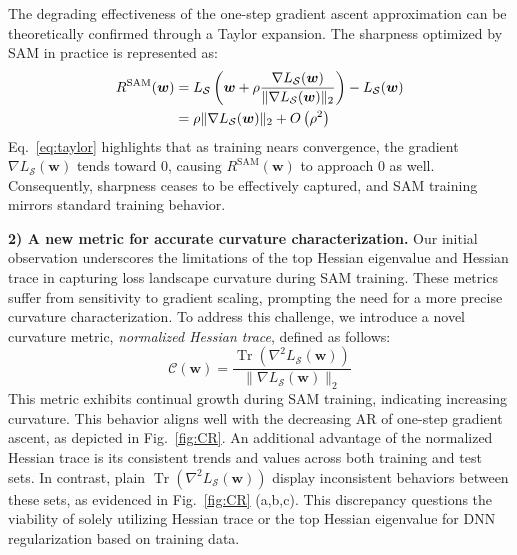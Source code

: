 \documentclass[letterpaper]{article} %
\theoremstyle{plain}
\theoremstyle{definition}
\newcommand{\fref}[1]{Fig.~\ref{#1}}
\begin{document}
The degrading effectiveness of the one-step gradient ascent approximation can be theoretically confirmed through a Taylor expansion. The sharpness optimized by SAM in practice is represented as:
\begin{align}\label{eq:taylor}
R^{\mathrm{SAM}}(\boldsymbol{w})&=L_{\mathcal{S}}\left(\boldsymbol{w}+\rho \frac{\nabla L_{\mathcal{S}}(\boldsymbol{w})}{\|\nabla L_{\mathcal{S}}(\boldsymbol{w})\|_2}\right)-L_{\mathcal{S}}(\boldsymbol{w}) \notag \\
&=\rho\|\nabla L_{\mathcal{S}}(\boldsymbol{w})\|_2 + O\left(\rho^2\right)
\end{align}
Eq.~\eqref{eq:taylor} highlights that as training nears convergence, the gradient $\nabla L_{\mathcal{S}}(\boldsymbol{w})$ tends toward $0$, causing $R^{\mathrm{SAM}}(\boldsymbol{w})$ to approach $0$ as well. Consequently, sharpness ceases to be effectively captured, and SAM training mirrors standard training behavior.


\textbf{2) A new metric for accurate curvature characterization.}
Our initial observation underscores the limitations of the top Hessian eigenvalue and Hessian trace in capturing loss landscape curvature during SAM training. These metrics suffer from sensitivity to gradient scaling, prompting the need for a more precise curvature characterization. To address this challenge, we introduce a novel curvature metric, \emph{normalized Hessian trace}, defined as follows:
\begin{equation}\label{eq:normHtr}
\mathcal{C}(\boldsymbol{w})=\frac{\operatorname{Tr}\left(\nabla^2 L_{\mathcal{S}}\left(\boldsymbol{w}\right)\right)}{\|\nabla L_{\mathcal{S}}(\boldsymbol{w})\|_2}
\end{equation}
This metric exhibits continual growth during SAM training, indicating increasing curvature. This behavior aligns well with the decreasing AR of one-step gradient ascent, as depicted in \fref{fig:CR}. An additional advantage of the normalized Hessian trace is its consistent trends and values across both training and test sets. In contrast, plain $\operatorname{Tr}\left(\nabla^2 L_{\mathcal{S}}\left(\boldsymbol{w}\right)\right)$ display inconsistent behaviors between these sets, as evidenced in \fref{fig:CR} (a,b,c). This discrepancy questions the viability of solely utilizing Hessian trace or the top Hessian eigenvalue for DNN regularization based on training data.
\end{document}
